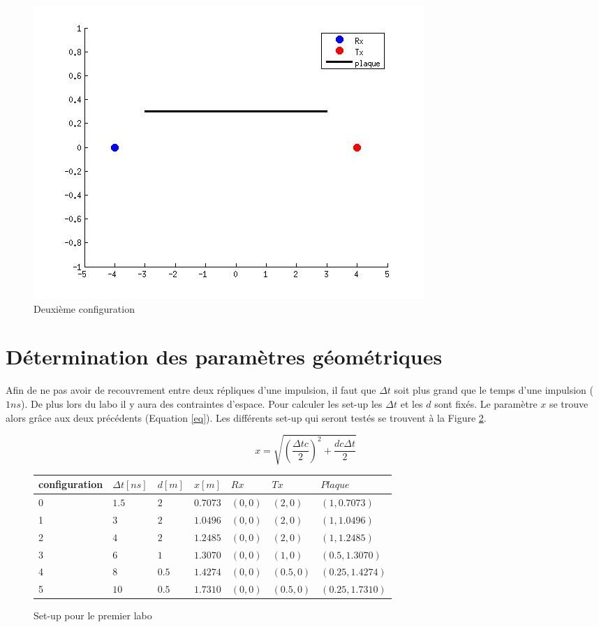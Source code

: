 \documentclass[10pt,a4paper]{article}
\begin{document}
	\begin{figure}[h]
	\centering
	\includegraphics[scale=0.4]{conf2.jpg}
	\caption{Deuxième configuration \label{conf2}}
	\end{figure}		
	
	
	\section{Détermination des paramètres géométriques}
		Afin de ne pas avoir de recouvrement entre deux répliques d'une impulsion, il faut que $\Delta t$ soit plus grand que le temps d'une impulsion ($1ns$). De plus lors du labo il y aura des contraintes d'espace. Pour calculer les set-up les $\Delta t$ et les $d$ sont fixés. Le paramètre $x$ se trouve alors grâce aux deux précédents (Equation \ref{eq}). Les différents set-up qui seront testés se trouvent à la Figure \ref{set}.
		
		\begin{equation}
			x = \sqrt{(\frac{\Delta t c}{2})^2 + \frac{d c \Delta t}{2}}
			\label{eq}
		\end{equation}
		
		
		\begin{figure}[h]
		\centering
		\begin{tabular}{|l|l|l|l|l|l|l|}
		\hline
		 configuration & $\Delta t [ns]$ & $d [m]$ & $x[m]$ & $Rx$ & $Tx$ & $Plaque$\\
		 \hline
		 0 & $1.5$ & $2$ & $0.7073$ & $(0,0)$ & $(2,0)$ & $(1,0.7073)$ \\ 
		 1 & $3$ & $2$ & $1.0496$ & $(0,0)$ & $(2,0)$ & $(1,1.0496)$  \\
		 2 & $4$ & $2$ & $1.2485$ & $(0,0)$ & $(2,0)$ & $(1,1.2485)$ \\
		 3 & $6$ & $1$ & $1.3070$ & $(0,0)$ & $(1,0)$ & $(0.5, 1.3070)$\\
		 4 & $8$ & $0.5$ & $1.4274$ & $(0,0)$ & $(0.5,0)$ & $(0.25, 1.4274)$ \\
		 5 & $10$ & $0.5$ & $1.7310$ & $(0,0)$ & $(0.5,0)$ & $(0.25,1.7310)$ \\
		 \hline
		\end{tabular}
		
		\caption{Set-up pour le premier labo}
		\label{set}
		\end{figure}
\end{document}
